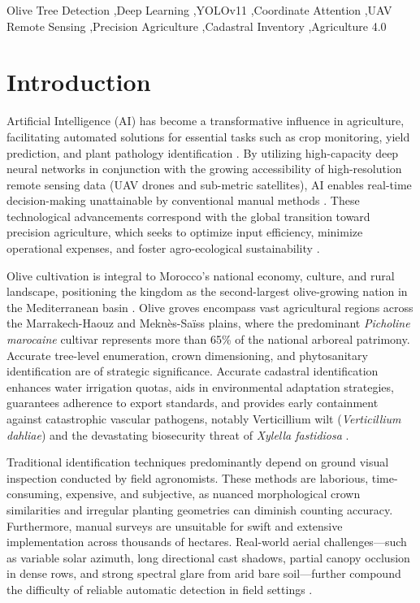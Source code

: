 \documentclass[5p,times]{elsarticle}
\begin{document}
\begin{frontmatter}
\begin{keyword}
Olive Tree Detection \sep Deep Learning \sep YOLOv11 \sep Coordinate Attention \sep UAV Remote Sensing \sep Precision Agriculture \sep Cadastral Inventory \sep Agriculture 4.0
\end{keyword}

\end{frontmatter}

\section{Introduction}
Artificial Intelligence (AI) has become a transformative influence in agriculture, facilitating automated solutions for essential tasks such as crop monitoring, yield prediction, and plant pathology identification \cite{kamilaris2018deep, too2019deep}. By utilizing high-capacity deep neural networks in conjunction with the growing accessibility of high-resolution remote sensing data (UAV drones and sub-metric satellites), AI enables real-time decision-making unattainable by conventional manual methods \cite{wolfert2017big}. These technological advancements correspond with the global transition toward precision agriculture, which seeks to optimize input efficiency, minimize operational expenses, and foster agro-ecological sustainability \cite{fao2024olive}.

Olive cultivation is integral to Morocco's national economy, culture, and rural landscape, positioning the kingdom as the second-largest olive-growing nation in the Mediterranean basin \cite{mapmdref2024green}. Olive groves encompass vast agricultural regions across the Marrakech-Haouz and Mekn\`es-Sa\"iss plains, where the predominant \textit{Picholine marocaine} cultivar represents more than 65\% of the national arboreal patrimony. Accurate tree-level enumeration, crown dimensioning, and phytosanitary identification are of strategic significance. Accurate cadastral identification enhances water irrigation quotas, aids in environmental adaptation strategies, guarantees adherence to export standards, and provides early containment against catastrophic vascular pathogens, notably Verticillium wilt (\textit{Verticillium dahliae}) and the devastating biosecurity threat of \textit{Xylella fastidiosa} \cite{moussaoui2026geospatial, jochum2023early, castillo2021spectral}.

Traditional identification techniques predominantly depend on ground visual inspection conducted by field agronomists. These methods are laborious, time-consuming, expensive, and subjective, as nuanced morphological crown similarities and irregular planting geometries can diminish counting accuracy. Furthermore, manual surveys are unsuitable for swift and extensive implementation across thousands of hectares. Real-world aerial challenges---such as variable solar azimuth, long directional cast shadows, partial canopy occlusion in dense rows, and strong spectral glare from arid bare soil---further compound the difficulty of reliable automatic detection in field settings \cite{maselli2012high, pena2018object}.
\end{document}
